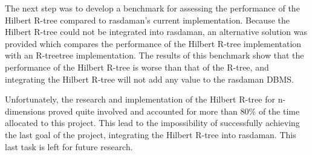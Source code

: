 \documentclass[11pt, a4paper, oneside]{article}
\newcommand{\rtree}{R-tree}
\begin{document}
The next step was to develop a benchmark for assessing the performance of the Hilbert R-tree compared to rasdaman's current implementation. Because the Hilbert R-tree could not be integrated into rasdaman, an alternative solution was provided which compares the performance of the Hilbert R-tree implementation with an \rtree tree implementation. The results of this benchmark show that the performance of the Hilbert R-tree is worse than that of the \rtree, and integrating the Hilbert R-tree will not add any value to the rasdaman DBMS.

Unfortunately, the research and implementation of the Hilbert R-tree for n-dimensions proved quite involved and accounted for more than 80\% of the time allocated to this project. This lead to the impossibility of successfully achieving the last goal of the project, integrating the Hilbert R-tree into rasdaman. This last task is left for future research. 

\newpage

\newpage


\newpage
\end{document}
